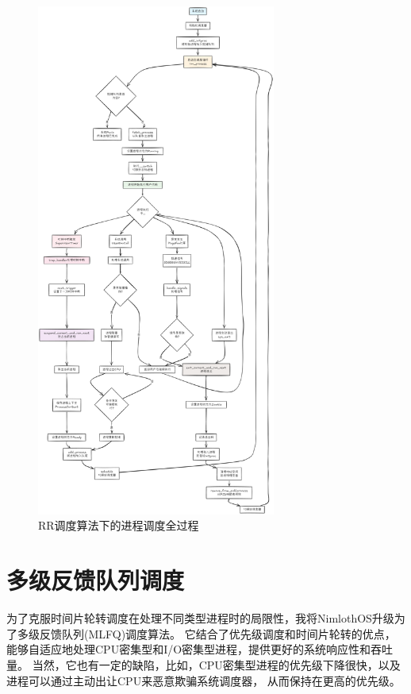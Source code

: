 \begin{figure}[htbp]
    \centering
    \includegraphics[width=0.7\textwidth]{../image/RR进程调度过程.png}
    \caption{RR调度算法下的进程调度全过程}
    \label{fig:rr-scheduling}
\end{figure}

\clearpage

\section{多级反馈队列调度}

为了克服时间片轮转调度在处理不同类型进程时的局限性，我将NimlothOS升级为了多级反馈队列(MLFQ)调度算法。
它结合了优先级调度和时间片轮转的优点，能够自适应地处理CPU密集型和I/O密集型进程，提供更好的系统响应性和吞吐量。
当然，它也有一定的缺陷，比如，CPU密集型进程的优先级下降很快，以及进程可以通过主动出让CPU来恶意欺骗系统调度器，
从而保持在更高的优先级。

